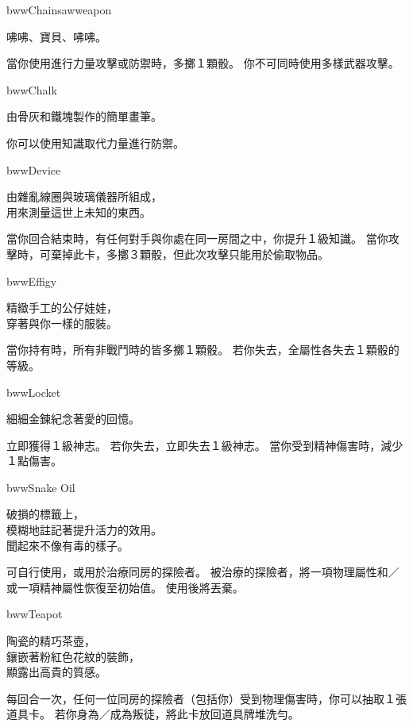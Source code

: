 \linebreak[0]%
\begin{ItemCard}{bww}{Chainsaw}{weapon}
  \begin{CardStory}
    咈咈、寶貝、咈咈。
  \end{CardStory}
  當你使用\ThisName{}進行力量攻擊或防禦時，多擲１顆骰。\smallbreak
  你不可同時使用多樣武器攻擊。\smallbreak
\end{ItemCard}%
\linebreak[0]%
\begin{ItemCard}{bww}{Chalk}{}
  \begin{CardStory}
    由骨灰和鐵塊製作的簡單畫筆。
  \end{CardStory}
  你可以使用知識取代力量進行防禦。\smallbreak
\end{ItemCard}%
\linebreak[0]%
\begin{ItemCard}{bww}{Device}{}
  \begin{CardStory}
    由雜亂線圈與玻璃儀器所組成，\\
    用來測量這世上未知的東西。
  \end{CardStory}
  當你回合結束時，有任何對手與你處在同一房間之中，你提升１級知識。\smallbreak
  當你攻擊時，可棄掉此卡，多擲３顆骰，但此次攻擊只能用於偷取物品。\smallbreak
\end{ItemCard}%
\linebreak[0]%
\begin{ItemCard}{bww}{Effigy}{}
  \begin{CardStory}
    精緻手工的公仔娃娃，\\
    穿著與你一樣的服裝。
  \end{CardStory}
  當你持有\ThisName{}時，所有非戰鬥時的皆多擲１顆骰。\smallbreak
  若你失去\ThisName{}，全屬性各失去１顆骰的等級。\smallbreak
\end{ItemCard}%
\linebreak[0]%
\begin{ItemCard}{bww}{Locket}{}
  \begin{CardStory}
    細細金鍊紀念著愛的回憶。
  \end{CardStory}
  立即獲得１級神志。\smallbreak
  若你失去\ThisName{}，立即失去１級神志。\smallbreak
  當你受到精神傷害時，減少１點傷害。\smallbreak
\end{ItemCard}%
\linebreak[0]%
\begin{ItemCard}{bww}{Snake Oil}{}
  \begin{CardStory}
    破損的標籤上，\\
    模糊地註記著提升活力的效用。\\
    聞起來不像有毒的樣子。
  \end{CardStory}
  可自行使用，或用於治療同房的探險者。\smallbreak
  被\ThisName{}治療的探險者，將一項物理屬性和／或一項精神屬性恢復至初始值。\smallbreak
  使用後將\ThisName{}丟棄。\smallbreak
\end{ItemCard}%
\linebreak[0]%
\begin{ItemCard}{bww}{Teapot}{}
  \begin{CardStory}
    陶瓷的精巧茶壺，\\
    鑲嵌著粉紅色花紋的裝飾，\\
    顯露出高貴的質感。
  \end{CardStory}
  每回合一次，任何一位同房的探險者（包括你）受到物理傷害時，你可以抽取１張道具卡。\smallbreak
  若你身為／成為叛徒，將此卡放回道具牌堆洗勻。\smallbreak
\end{ItemCard}%
\linebreak[0]%
